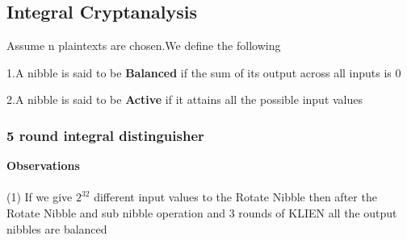 \documentclass[preprint]{transcrypto}
\begin{document}
\subsection{Integral Cryptanalysis}

Assume n plaintexts are chosen.We define the following 

1.A nibble is said to be \textbf{Balanced} if the sum of its output across all inputs is 0

2.A nibble is said to be \textbf{Active} if it attains all the possible input values 

\subsubsection{5 round integral distinguisher}

\textbf{Observations}\\ \\

(1) If we give $2^{32}$ different input values to the Rotate Nibble then after the Rotate Nibble and sub nibble operation and 3 rounds of KLIEN all the output nibbles are balanced \\ \\
\end{document}
